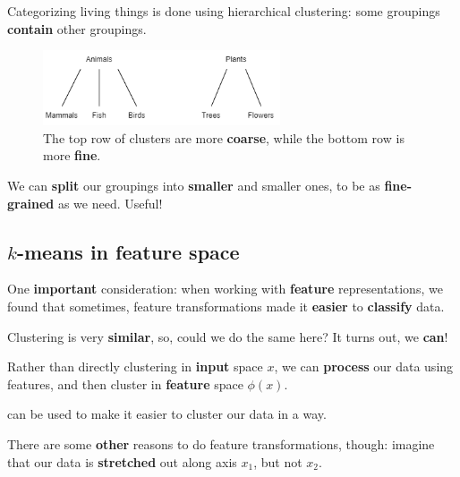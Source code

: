         \miniex Categorizing living things is done using hierarchical clustering: some groupings \textbf{contain} other groupings.
        
        \begin{figure}[H]
            \centering
            \includegraphics[width=70mm,scale=0.4]{images/clustering_images/hierarchical_life.png}
            \caption*{The top row of clusters are more \textbf{coarse}, while the bottom row is more \textbf{fine}.}
        \end{figure}
        
        We can \textbf{split} our groupings into \textbf{smaller} and smaller ones, to be as \textbf{fine-grained} as we need. Useful!

    \subsection{$k$-means in feature space}
        
        One \textbf{important} consideration: when working with \textbf{feature} representations, we found that sometimes, feature transformations made it \textbf{easier} to \textbf{classify} data.
            
        Clustering is very \textbf{similar}, so, could we do the same here? It turns out, we \textbf{can}!
        
        Rather than directly clustering in \textbf{input} space $x$, we can \textbf{process} our data using features, and then cluster in \textbf{feature} space $\phi(x)$.\\
        
        \begin{concept}
             can be used to make it easier to  cluster our data in a  way.
        \end{concept}
        
        There are some \textbf{other} reasons to do feature transformations, though: imagine that our data is \textbf{stretched} out along axis $x_1$, but not $x_2$.
        
        
